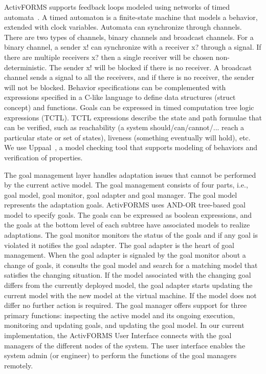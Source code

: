 ActivFORMS supports feedback loops modeled using networks of timed automata~\cite{Alur1990}. A timed automaton is a finite-state machine that models a behavior, extended with clock variables. Automata can synchronize through channels. There are two types of channels, binary channels and broadcast channels. For a binary channel, a sender x! can synchronize with a receiver x? through a signal. If there are multiple receivers x? then a single receiver will be chosen non-deterministic. The sender x! will be blocked if there is no receiver. A broadcast channel sends a signal to all the receivers, and if there is no receiver, the sender will not be blocked. Behavior specifications can be complemented with expressions specified in a C-like language to define data structures (struct concept) and functions. Goals can be expressed in timed computation tree logic expressions (TCTL). TCTL expressions describe the state and path formulae that can be verified, such as reachability (a system should/can/cannot/... reach a particular state or set of states), liveness (something eventually will hold), etc. We use Uppaal~\cite{Behrmann2004}, a model checking tool that supports modeling of behaviors and verification of properties.

The goal management layer handles adaptation issues that cannot be performed by the current active model. The goal management consists of four parts, i.e., goal model, goal monitor, goal adapter and goal manager. The goal model represents the adaptation goals. ActivFORMS uses AND-OR tree-based goal model to specify goals. The goals can be expressed as boolean expressions, and the goals at the bottom level of each subtree have associated models to realize adaptations. The goal monitor monitors the status of the goals and if any goal is violated it notifies the goal adapter. The goal adapter is the heart of goal management. When the goal adapter is signaled by the goal monitor about a change of goals, it consults the goal model and search for a matching model that satisfies the changing situation. If the model associated with the changing goal differs from the currently deployed model, the goal adapter starts updating the current model with the new model at the virtual machine. If the model does not differ no further action is required. The goal manager offers support for three primary functions: inspecting the active model and its ongoing execution, monitoring and updating goals, and updating the goal model. In our current implementation, the ActivFORMS User Interface connects with the goal managers of the different nodes of the system. The user interface enables the system admin (or engineer) to perform the functions of the goal managers remotely.
